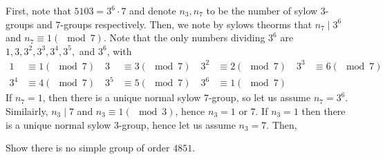 \documentclass[a4paper]{article}
\begin{document}
\begin{solution}
	First, note that \(5103 = 3^{6} \cdot 7\) and denote \(n_3, n_7\) to be the number of sylow \(3\)-groups and \(7\)-groups respectively. Then, we note by sylows theorms that \(n_7 \mid 3^{6}\) and \(n_7 \equiv 1 \left( \mod 7 \right) \). Note that the only numbers dividing \(3^{6}\) are \(1, 3, 3^2, 3^3, 3^{4}, 3^{5}, \) and \(3^{6}\), with
	\begin{align*}
		1 &\equiv 1 \left( \mod 7 \right) \quad
		3 &\equiv 3 \left( \mod 7 \right) \quad
		3^2 &\equiv 2 \left( \mod 7 \right) \quad
		3^3 &\equiv 6 \left( \mod 7 \right) \\
		3^{4} &\equiv 4 \left( \mod 7 \right) \quad
		3^{5} &\equiv 5 \left( \mod 7 \right) \quad
		3^{6} &\equiv 1 \left( \mod 7 \right) \quad
		\end{align*}
		If \(n_7 = 1\), then there is a unique normal sylow \(7\)-group, so let us assume \(n_7 = 3^{6}\). Similairly, \(n_3 \mid 7\) and \(n_3 \equiv 1 \left( \mod 3 \right) \), hence \(n_3 = 1\) or \(7\). If \(n_3 = 1\)  then there is a unique normal sylow \(3\)-group, hence let us assume \(n_3 = 7\). Then,
\end{solution}
\newpage
\begin{problem}[5]
	Show there is no simple group of order \(4851\).
\end{problem}
\begin{solution}
\end{solution}
\end{document}
